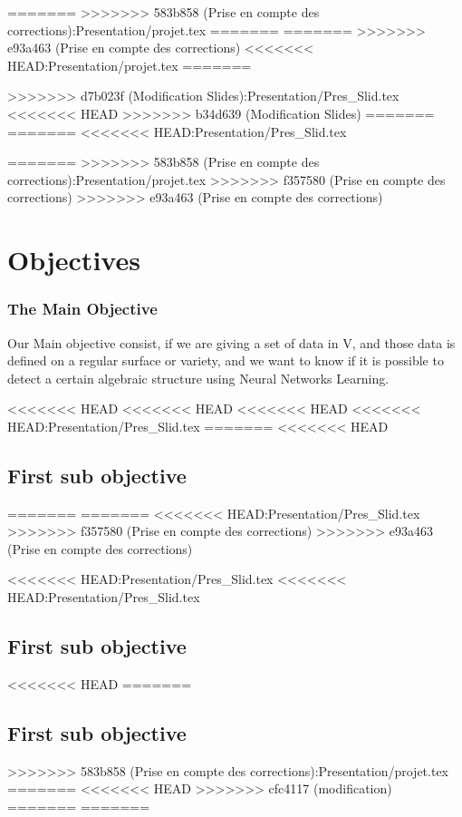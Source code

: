 \documentclass{beamer}
\begin{document}
=======
>>>>>>> 583b858 (Prise en compte des corrections):Presentation/projet.tex
=======
=======
>>>>>>> e93a463 (Prise en compte des corrections)
<<<<<<< HEAD:Presentation/projet.tex
=======

>>>>>>> d7b023f (Modification Slides):Presentation/Pres_Slid.tex
<<<<<<< HEAD
>>>>>>> b34d639 (Modification Slides)
=======
=======
<<<<<<< HEAD:Presentation/Pres_Slid.tex

=======
>>>>>>> 583b858 (Prise en compte des corrections):Presentation/projet.tex
>>>>>>> f357580 (Prise en compte des corrections)
>>>>>>> e93a463 (Prise en compte des corrections)
\section{Objectives}
\begin{frame}
    \frametitle{The Main Objective}
    Our Main objective consist,  if we are giving a set of data in V, and those data is defined on a regular surface or variety, and we want to know if it is possible to detect a certain algebraic structure using Neural Networks Learning.
\end{frame}
<<<<<<< HEAD
<<<<<<< HEAD
<<<<<<< HEAD
<<<<<<< HEAD:Presentation/Pres_Slid.tex
=======
<<<<<<< HEAD
\subsection{First sub objective}
=======
=======
<<<<<<< HEAD:Presentation/Pres_Slid.tex
>>>>>>> f357580 (Prise en compte des corrections)
>>>>>>> e93a463 (Prise en compte des corrections)

<<<<<<< HEAD:Presentation/Pres_Slid.tex
<<<<<<< HEAD:Presentation/Pres_Slid.tex
\subsection{First sub objective} 
<<<<<<< HEAD
=======
\subsection{First sub objective}
>>>>>>> 583b858 (Prise en compte des corrections):Presentation/projet.tex
=======
<<<<<<< HEAD
>>>>>>> cfc4117 (modification)
=======
=======
\end{document}
